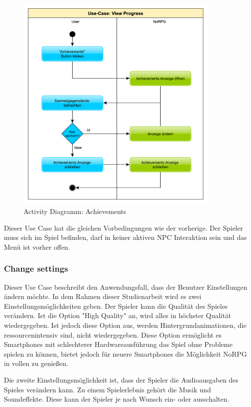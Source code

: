 			\begin{figure}[htbp]
				\centering 
				\label{umlAchievements}
				\includegraphics[width=10cm]{pics/Achievements.pdf}
				\caption{Activity Diagramm: Achievements}
			\end{figure}
			
			Dieser Use Case hat die gleichen Vorbedingungen wie der vorherige. Der Spieler muss sich im Spiel befinden, darf in keiner aktiven \ac{NPC} Interaktion sein und das Menü ist vorher offen.
		
		\subsubsection{Change settings}
			Dieser Use Case beschreibt den Anwendungsfall, dass der Benutzer Einstellungen ändern möchte. In dem Rahmen dieser Studienarbeit wird es zwei Einstellungsmöglichkeiten geben. Der Spieler kann die Qualität des Spieles verändern. Ist die Option "High Quality" an, wird alles in höchster Qualität wiedergegeben. Ist jedoch diese Option aus, werden Hintergrundanimationen, die ressourcenintensiv sind, nicht wiedergegeben. Diese Option ermöglicht es Smartphones mit schlechterer Hardwareausführung das Spiel ohne Probleme spielen zu können, bietet jedoch für neuere Smartphones die Möglichkeit NoRPG in vollen zu genießen.
			
			Die zweite Einstellungsmöglichkeit ist, dass der Spieler die Audioausgaben des Spieles verändern kann. Zu einem Spielerlebnis gehört die Musik und Soundeffekte. Diese kann der Spieler je nach Wunsch ein- oder ausschalten.

